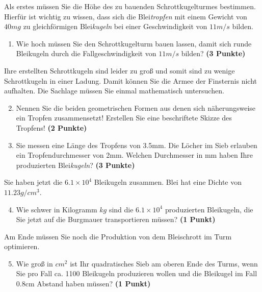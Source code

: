 \documentclass[a4paper, 9pt]{scrartcl}\usepackage[]{graphicx}\usepackage[]{xcolor}
\begin{document}
Als erstes m{\"u}ssen Sie die H{\"o}he des zu bauenden Schrottkugelturmes
bestimmen. Hierf{\"u}r ist wichtig zu wissen, dass sich die
Blei\textit{tropfen} mit einem Gewicht von $40mg$ zu
gleichf{\"o}rmigen Blei\textit{kugeln} bei einer Geschwindigkeit von
$11m/s$ bilden.

\begin{enumerate}
\item Wie hoch m{\"u}ssen Sie den Schrottkugelturm bauen lassen, damit sich
  runde Bleikugeln durch die Fallgeschwindigkeit von $11m/s$ bilden?
  \textbf{(3 Punkte)}
\end{enumerate}

Ihre erstellten Schrottkugeln sind leider zu gro{\ss} und somit sind zu wenige
Schrottkugeln in einer Ladung. Damit k{\"o}nnen Sie die Armee der Finsternis
nicht aufhalten. Die Sachlage m{\"u}ssen Sie einmal mathematisch untersuchen.

\begin{enumerate}
  \setcounter{enumi}{1}
\item Nennen Sie die beiden geometrischen Formen aus denen sich
  n{\"a}herungsweise ein Tropfen zusammensetzt! Erstellen Sie eine beschriftete 
  Skizze des Tropfens!
  \textbf{(2 Punkte)}
\item Sie messen eine L{\"a}nge des Tropfens von 3.5mm. Die L{\"o}cher
  im Sieb erlauben ein Tropfendurchmesser von 2mm. Welchen
  Durchmesser in mm haben Ihre produzierten Blei\textit{kugeln}?  \textbf{(3 Punkte)}
\end{enumerate}

Sie haben jetzt die \ensuremath{6.1\times 10^{4}} Bleikugeln zusammen. Blei hat eine Dichte
von $11.23g/cm^3$.

\begin{enumerate}
  \setcounter{enumi}{3}
\item Wie schwer in Kilogramm $kg$ sind die \ensuremath{6.1\times 10^{4}} produzierten
  Bleikugeln, die Sie jetzt auf die Burgmauer transportieren m{\"u}ssen?
  \textbf{(1 Punkt)}
\end{enumerate}

Am Ende m{\"u}ssen Sie noch die Produktion von dem Bleischrott im Turm optimieren.

\begin{enumerate}
  \setcounter{enumi}{4}
\item Wie gro{\ss} in $cm^2$ ist Ihr quadratisches Sieb am oberen Ende des Turms,
  wenn Sie pro Fall ca. 1100 Bleikugeln produzieren wollen und
  die Bleikugel im Fall 0.8cm Abstand haben m{\"u}ssen?  \textbf{(1
    Punkt)}
\end{enumerate}
 
\end{document}
